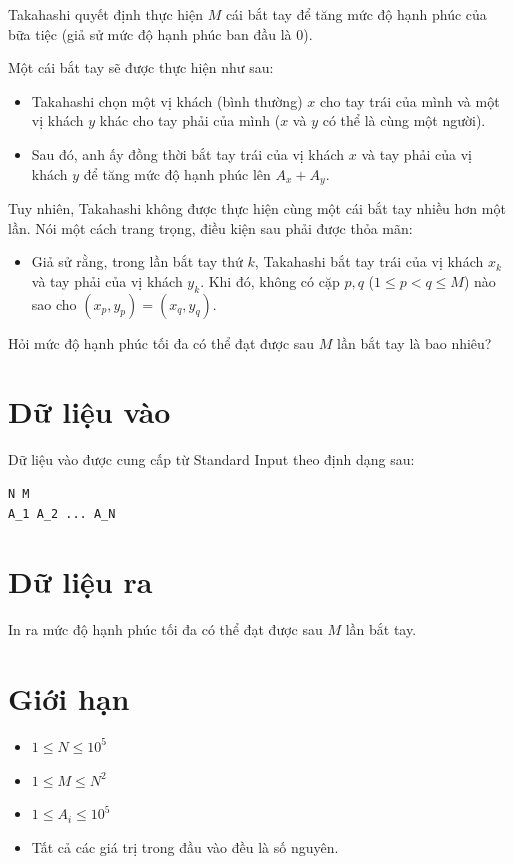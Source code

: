 \documentclass[12pt,a4paper]{article}
\begin{document}
Takahashi quyết định thực hiện $M$ cái bắt tay để tăng mức độ hạnh phúc của bữa tiệc (giả sử mức độ hạnh phúc ban đầu là $0$).

Một cái bắt tay sẽ được thực hiện như sau:
\begin{itemize}
    \item Takahashi chọn một vị khách (bình thường) $x$ cho tay trái của mình và một vị khách $y$ khác cho tay phải của mình ($x$ và $y$ có thể là cùng một người).
    \item Sau đó, anh ấy đồng thời bắt tay trái của vị khách $x$ và tay phải của vị khách $y$ để tăng mức độ hạnh phúc lên $A_x + A_y$.
\end{itemize}

Tuy nhiên, Takahashi không được thực hiện cùng một cái bắt tay nhiều hơn một lần. Nói một cách trang trọng, điều kiện sau phải được thỏa mãn:
\begin{itemize}
    \item Giả sử rằng, trong lần bắt tay thứ $k$, Takahashi bắt tay trái của vị khách $x_k$ và tay phải của vị khách $y_k$. Khi đó, không có cặp $p, q$ ($1 \le p < q \le M$) nào sao cho $(x_p, y_p) = (x_q, y_q)$.
\end{itemize}

Hỏi mức độ hạnh phúc tối đa có thể đạt được sau $M$ lần bắt tay là bao nhiêu?

\section*{Dữ liệu vào}
Dữ liệu vào được cung cấp từ Standard Input theo định dạng sau:
\begin{lstlisting}
N M
A_1 A_2 ... A_N
\end{lstlisting}

\section*{Dữ liệu ra}
In ra mức độ hạnh phúc tối đa có thể đạt được sau $M$ lần bắt tay.

\section*{Giới hạn}
\begin{constraintbox}
\begin{itemize}
    \item $1 \le N \le 10^5$
    \item $1 \le M \le N^2$
    \item $1 \le A_i \le 10^5$
    \item Tất cả các giá trị trong đầu vào đều là số nguyên.
\end{itemize}
\end{constraintbox}
\end{document}
